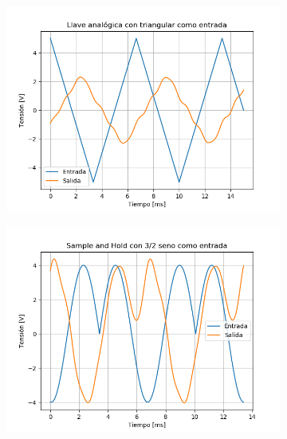 \begin{figure}[H]
	\begin{subfigure}{.5\textwidth}
	\centering
	\includegraphics[width=\textwidth]{ImagenesEjercicio6/puntoa/LA - Tri.png}
	\end{subfigure}
	\begin{subfigure}{.5\textwidth}
	\centering
	\includegraphics[width=\textwidth]{ImagenesEjercicio6/puntoa/SH - 3 2.png}
	\end{subfigure}
	

\end{figure}
